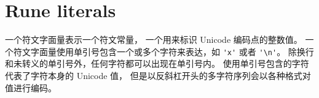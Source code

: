 \newcommand{\rune}{符文}

\section{Rune literals}
一个\rune{}字面量表示一个\rune{}常量，
一个用来标识 Unicode 编码点的整数值。
一个\rune{}字面量使用单引号包含一个或多个字符来表达，如 \verb|'x'| 或者 \verb|'\n'|。
除换行和未转义的单引号外，任何字符都可以出现在单引号内。
使用单引号包含的字符代表了字符本身的 Unicode 值，
但是以反斜杠开头的多字符序列会以各种格式对值进行编码。
